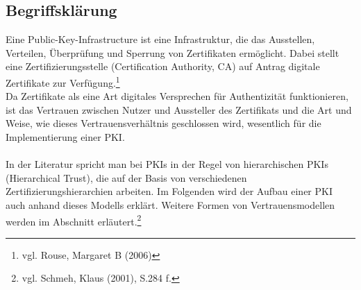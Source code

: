 \subsection{Begriffsklärung}
Eine Public-Key-Infrastructure ist eine Infrastruktur, die das Ausstellen, Verteilen, Überprüfung und Sperrung von Zertifikaten ermöglicht.
Dabei stellt eine Zertifizierungsstelle (Certification Authority, CA) auf Antrag digitale Zertifikate zur Verfügung.\footnote{vgl. Rouse, Margaret B (2006)}\\
Da Zertifikate als eine Art digitales Versprechen für Authentizität funktionieren, ist das Vertrauen zwischen Nutzer und Aussteller des Zertifikats und die Art und Weise, wie dieses Vertrauensverhältnis geschlossen wird, wesentlich für die Implementierung einer PKI.\\
\\
In der Literatur spricht man bei PKIs in der Regel von hierarchischen PKIs (Hierarchical Trust), die auf der Basis von verschiedenen Zertifizierungshierarchien arbeiten. Im Folgenden wird der Aufbau einer PKI auch anhand dieses Modells erklärt. Weitere Formen von Vertrauensmodellen werden im Abschnitt \textit{} erläutert.\footnote{vgl. Schmeh, Klaus (2001), S.284 f.}

